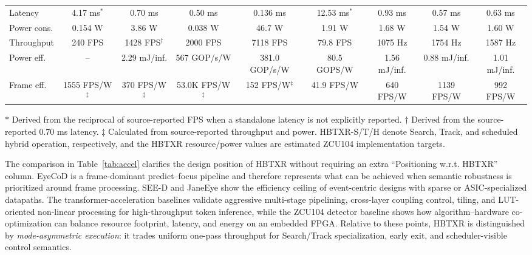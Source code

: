\documentclass[journal]{IEEEtran}
\begin{document}
\begin{table}[t]
{\begin{tabular}{@{}lcccccccc@{}}
Latency & 4.17 ms$^\ast$ & 0.70 ms & 0.50 ms & 0.136 ms & 12.53 ms$^\ast$ & 0.93 ms & 0.57 ms & 0.63 ms \\
Power cons. & 0.154 W & 3.86 W & 0.038 W & 46.7 W & 1.91 W & 1.68 W & 1.54 W & 1.60 W \\
Throughput & 240 FPS & 1428 FPS$^\dagger$ & 2000 FPS & 7118 FPS & 79.8 FPS & 1075 Hz & 1754 Hz & 1587 Hz \\
Power eff. & -- & 2.29 mJ/inf. & 567 GOP/s/W & 381.0 GOP/s/W & 80.5 GOPS/W & 1.56 mJ/inf. & 0.88 mJ/inf. & 1.01 mJ/inf. \\
Frame eff. & 1555 FPS/W$^\ddagger$ & 370 FPS/W$^\ddagger$ & 53.0K FPS/W$^\ddagger$ & 152 FPS/W$^\ddagger$ & 41.9 FPS/W & 640 FPS/W & 1139 FPS/W & 992 FPS/W \\
\bottomrule
\end{tabular}}
\vspace{1mm}
\parbox{\textwidth}{\footnotesize $\ast$ Derived from the reciprocal of source-reported FPS when a standalone latency is not explicitly reported. $\dagger$ Derived from the source-reported 0.70 ms latency. $\ddagger$ Calculated from source-reported throughput and power. HBTXR-S/T/H denote Search, Track, and scheduled hybrid operation, respectively, and the HBTXR resource/power values are estimated ZCU104 implementation targets.}
\end{table}

The comparison in Table~\ref{tab:accel} clarifies the design position of HBTXR without requiring an extra ``Positioning w.r.t. HBTXR'' column. EyeCoD is a frame-dominant predict--focus pipeline and therefore represents what can be achieved when semantic robustness is prioritized around frame processing. SEE-D and JaneEye show the efficiency ceiling of event-centric designs with sparse or ASIC-specialized datapaths. The transformer-acceleration baselines validate aggressive multi-stage pipelining, cross-layer coupling control, tiling, and LUT-oriented non-linear processing for high-throughput token inference, while the ZCU104 detector baseline shows how algorithm--hardware co-optimization can balance resource footprint, latency, and energy on an embedded FPGA. Relative to these points, HBTXR is distinguished by \emph{mode-asymmetric execution}: it trades uniform one-pass throughput for Search/Track specialization, early exit, and scheduler-visible control semantics.
\end{document}

